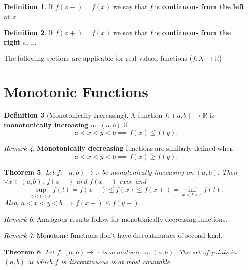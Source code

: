 \documentclass[a4paper,12pt]{report}
\newcommand{\R}{\mathbb{R}}
\newcommand{\tb}{\textbf}
\theoremstyle{plain}
\newtheorem{theorem}{\color{blue}Theorem}[chapter] %
\theoremstyle{definition}
\newtheorem{definition}[theorem]{\color{red}Definition} %
\theoremstyle{remark}
\newtheorem{remark}[theorem]{\color{ForestGreen}Remark} %
\begin{document}
\begin{definition} If $f(x-)=f(x)$ we say that $f$ is \tb{continuous from the left} at $x$.
\end{definition}
\begin{definition} If $f(x+)=f(x)$ we say that $f$ is \tb{continuous from the right} at $x$.
\end{definition}
\noindent The following sections are applicable for real valued functions ($f:X\to\R$)

\section{Monotonic Functions}
\begin{definition}[Monotonically Increasing] A function $f:(a,b)\to\R$ is \tb{monotonically increasing} on $(a,b)$ if
\[
a<x<y<b\implies f(x)\leq f(y).
\]
\end{definition}
\begin{remark} \tb{Monotonically decreasing} functions are similarly defined when
\[
a<x<y<b\implies f(x)\geq f(y).
\]
\end{remark}
\begin{theorem}
Let $f:(a,b)\to\R$ be monotonically increasing on $(a,b)$. Then $\forall x\in(a,b)$, $f(x+)$ and $f(x-)$ exist and
\[
\sup_{a<t<x}f(t)=f(x-)\leq f(x)\leq f(x+)=\inf_{x<t<b}f(t).
\]
Also, $a<x<y<b\implies f(x+)\leq f(y-)$.
\end{theorem}
\begin{remark}
Analogous results follow for monotonically decreasing functions.
\end{remark}
\begin{remark}
Monotonic functions don't have discontinuities of second kind.
\end{remark}
\begin{theorem}
Let $f:(a,b)\to\R$ is monotonic on $(a,b)$. The set of points in $(a,b)$ at which $f$ is discontinuous is \emph{at most countable}.
\end{theorem}
\end{document}
